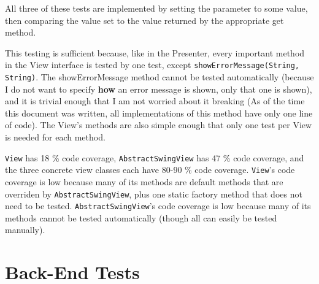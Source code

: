\documentclass[11pt]{article}
\begin{document}
All three of these tests are implemented by setting the parameter to some value, then comparing the value set to the value returned by the appropriate get method.

This testing is sufficient because, like in the Presenter, every important method in the View interface is tested by one test, except \texttt{showErrorMessage(String, String)}.  The showErrorMessage method cannot be tested automatically (because I do not want to specify \textbf{how} an error message is shown, only that one is shown), and it is trivial enough that I am not worried about it breaking (As of the time this document was written, all implementations of this method have only one line of code).  The View's methods are also simple enough that only one test per View is needed for each method.

\texttt{View} has 18 \% code coverage, \texttt{AbstractSwingView} has 47 \% code coverage, and the three concrete view classes each have 80-90 \% code coverage.  \texttt{View}'s code coverage is low because many of its methods are default methods that are overriden by \texttt{AbstractSwingView}, plus one static factory method that does not need to be tested.  \texttt{AbstractSwingView}'s code coverage is low because many of its methods cannot be tested automatically (though all can easily be tested manually).
\newpage

\section{Back-End Tests}
\label{sec:org285646a}
\end{document}
